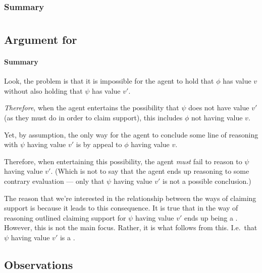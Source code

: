 \subsubsection{Summary}

\section{\FCS{}}
\label{sec:fcs-1}

\subsection{Argument for \FCS{}}
\label{sec:argument-fcs}

\paragraph{Summary}

\begin{note}[To summarise]
  Look, the problem is that it is impossible for the agent to hold that \(\phi\) has value \(v\) without also holding that \(\psi\) has value \(v'\).

  \emph{Therefore}, when the agent entertains the possibility that \(\psi\) does not have value \(v'\) (as they must do in order to claim support), this includes \(\phi\) not having value \(v\).

  Yet, by assumption, the only way for the agent to conclude some line of reasoning with \(\psi\) having value \(v'\) is by appeal to \(\phi\) having value \(v\).

  Therefore, when entertaining this possibility, the agent \emph{must} fail to reason to \(\psi\) having value \(v'\).
  (Which is not to say that the agent ends up reasoning to some contrary evaluation --- only that \(\psi\) having value \(v'\) is not a possible conclusion.)

  The reason that we're interested in the relationship between the ways of claiming support is because it leads to this consequence.
  It is true that in the way of reasoning outlined claiming support for \(\psi\) having value \(v'\) ends up being a \requ{}.
  However, this is not the main focus.
  Rather, it is what follows from this.
  I.e.\ that \(\psi\) having value \(v'\) is a \requ{}.
\end{note}

\subsection{Observations}
\label{sec:observations-fcs}

